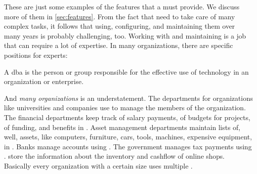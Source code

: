These are just some examples of the features that a  must provide.
We discuss more of them in \cref{sec:features}.
From the fact that  need to take care of many complex tasks, it follows that using, configuring, and maintaining them over many years is probably challenging, too.
Working with and maintaining  is a job that can require a lot of expertise.
In many organizations, there are specific positions for  experts:%
%
\begin{definition}
A \acrfull{dba} is the person or group responsible for the effective use of  technology in an organization or enterprise.
\end{definition}%
%
And \emph{many organizations} is an understatement.
The  departments for organizations like universities and companies use  to manage the members of the organization.
The financial departments keep track of salary payments, of budgets for projects, of funding, and benefits in .
Asset management departments maintain lists of, well, assets, like computers, furniture, cars, tools, machines, expensive equipment, in .
Banks manage accounts using .
The government manages tax payments using .
 store the information about the inventory and cashflow of online shops.
Basically every organization with a certain size uses multiple .%
%
%
%
%
%
\endhsection\endhsection%
%
